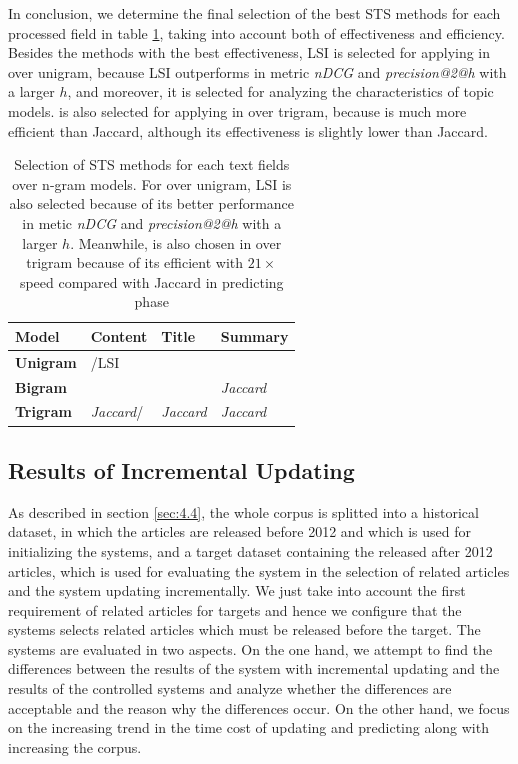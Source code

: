 In conclusion, we determine the final selection of the best STS methods for each processed field in table \ref{tab:select}, taking into account both of effectiveness and efficiency. Besides the methods with the best effectiveness, LSI is selected for applying in \icontent{} over unigram, because LSI outperforms \tfidf{} in metric \textit{nDCG} and \textit{precision@2@h} with a larger $h$, and moreover, it is selected for analyzing the characteristics of topic models. \tfidf{} is also selected for applying in \icontent{} over trigram, because \tfidf{} is much more efficient than Jaccard, although its effectiveness is slightly lower than Jaccard. 

\begin{table}[!htb]
\centering
\small
\begin{tabularx}{0.8\textwidth}{|X|X|X|X|}
\hline
\textbf{Model} & \textbf{Content} & \textbf{Title} & \textbf{Summary} \\ \hline
\textbf{Unigram} & \tfidf{}/LSI & \tfidf{} & \tfidf{} \\ \hline
\textbf{Bigram} & \tfidf{} & \tfidf{} & \textit{Jaccard} \\ \hline
\textbf{Trigram} & \textit{Jaccard}/\tfidf{} & \textit{Jaccard} & \textit{Jaccard} \\ \hline
\end{tabularx}
\caption[Selection of STS methods for each text fields over n-gram models.]{Selection of STS methods for each text fields over n-gram models. For \icontent{} over unigram, LSI is also selected because of its better performance in metic \textit{nDCG} and \textit{precision@2@h} with a larger $h$. Meanwhile, \tfidf{} is also chosen in \icontent{} over trigram because of its efficient with $21 \times$ speed compared with Jaccard in predicting phase} 
\label{tab:select}
\end{table}


\subsection{Results of Incremental Updating}
\label{sec:5.4}

As described in section \ref{sec:4.4}, the whole corpus is splitted into a historical dataset, in which the articles are released before 2012 and which is used for initializing the systems, and a target dataset containing the released after 2012 articles, which is used for evaluating the system in the selection of related articles and the system updating incrementally. We just take into account the first requirement of related articles for targets and hence we configure that the systems selects related articles which must be released before the target. The systems are evaluated in two aspects. On the one hand, we attempt to find the differences between the results of the system with incremental updating and the results of the controlled systems and analyze whether the differences are acceptable and the reason why the differences occur. On the other hand, we focus on the increasing trend in the time cost of updating and predicting along with increasing the corpus. 

